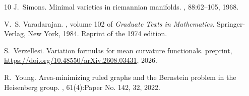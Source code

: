\documentclass[11pt]{amsart}
\theoremstyle{definition}
\theoremstyle{remark}
\numberwithin{equation}{section}
\begin{document}
\begin{thebibliography}{10}
J.~Simons.
\newblock Minimal varieties in riemannian manifolds.
, 88:62--105, 1968.

V.~S. Varadarajan.
, volume 102 of {\em Graduate Texts in Mathematics}.
\newblock Springer-Verlag, New York, 1984.
\newblock Reprint of the 1974 edition.

S.~Verzellesi.
\newblock Variation formulas for mean curvature functionals.
\newblock preprint, \url{https://doi.org/10.48550/arXiv.2608.03431}, 2026.

R.~Young.
\newblock Area-minimizing ruled graphs and the {B}ernstein problem in the {H}eisenberg group.
, 61(4):Paper No. 142, 32, 2022.

\end{thebibliography}
\end{document}
